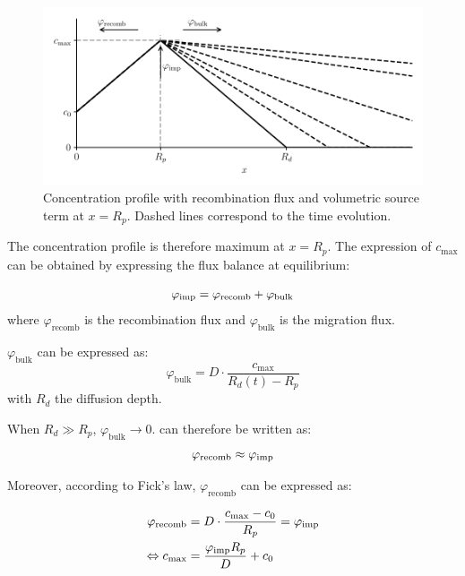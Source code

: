 \begin{figure}[h!]
    \centering
    \includegraphics[width=0.75\linewidth]{Figures/Chapter2/recomb_sketch.pdf}
    \caption{Concentration profile with recombination flux and volumetric source term at $x=R_p$. Dashed lines correspond to the time evolution.}
\end{figure}

The concentration profile is therefore maximum at $x=R_p$.
The expression of $c_\mathrm{max}$ can be obtained by expressing the flux balance at equilibrium:

\begin{equation}
    \varphi_\mathrm{imp} = \varphi_\mathrm{recomb} + \varphi_\mathrm{bulk}
    \labeq{flux balance}
\end{equation}
where $\varphi_\mathrm{recomb}$ is the recombination flux and $\varphi_\mathrm{bulk}$ is the migration flux.

$\varphi_\mathrm{bulk}$ can be expressed as:
\begin{equation}
    \varphi_\mathrm{bulk} = D \cdot \frac{c_\mathrm{max}}{R_d(t) - R_p}
\end{equation}
with $R_d$ the diffusion depth.

When $R_d \gg R_p$, $\varphi_\mathrm{bulk} \rightarrow 0$.
 can therefore be written as:
\begin{equation}
    \varphi_\mathrm{recomb} \approx \varphi_\mathrm{imp}
    \labeq{flux balance 2}
\end{equation}

Moreover, according to Fick's law, $\varphi_\mathrm{recomb}$ can be expressed as:

\begin{align}
    \varphi_\mathrm{recomb} &= D \cdot \frac{c_\mathrm{max}-c_{0}}{R_{p}} = \varphi_\mathrm{imp}\\
    \Leftrightarrow c_\mathrm{max} &= \frac{\varphi_\mathrm{imp} R_{p}}{D}+ c_0
    \labeq{c_max}
\end{align}

